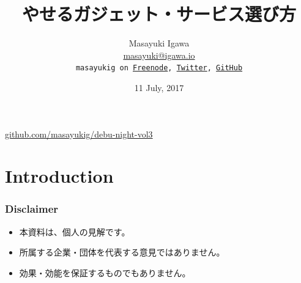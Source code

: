 \documentclass[aspectratio=169,11pt,hyperref={colorlinks=true}]{beamer}
\author[Masayuki Igawa]{%
  \texorpdfstring{%
    \centering
    Masayuki Igawa\\
    \href{mailto:masayuki@igawa.io}{masayuki@igawa.io}\\
    \texttt{masayukig on \href{http://freenode.net/}{Freenode},
     \href{https://twitter.com/masayukig}{Twitter},
     \href{https://github.com/masayukig}{GitHub}}
  }
  {Masayuki Igawa}
}
\date{11 July, 2017}
\title[How to select good gadgets and services for diet
\hspace{2em}\insertframenumber/\inserttotalframenumber]{やせるガジェット・サービス選び方}
\begin{document}
{%
\begin{frame}[noframenumbering]
  \hypersetup{colorlinks,urlcolor=suse}
  \titlepage{}
  \centering
  \@place \par
  \href{https://github.com/masayukig/debu-night-vol3}{github.com/masayukig/debu-night-vol3}
\end{frame}
}


\section{Introduction}
\begin{frame}
  \frametitle{Disclaimer}
  \begin{itemize}
    \item 本資料は、個人の見解です。
    \item 所属する企業・団体を代表する意見ではありません。
    \item 効果・効能を保証するものでもありません。
  \end{itemize}
\end{frame}
\end{document}
